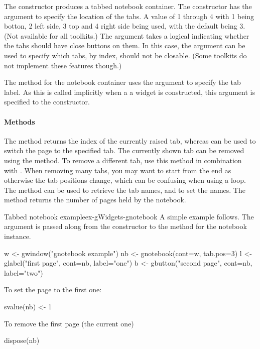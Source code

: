 The  constructor produces a tabbed notebook
container. The constructor has the argument 
to specify the location of the tabs. A value of 1 through 4 with 1
being botton, 2 left side, 3 top and 4 right side being used, with the
default being 3. (Not available for all toolkits.) The  argument takes a logical
indicating whether the tabs should have close buttons on them. In this
case, the argument  can be used to
specify which tabs, by index, should not be closable. (Some toolkits do
not implement these features though.)

The  method for the notebook container uses the 
argument to specify the tab label. As this is called implicitly when a a widget is constructed, this argument is specified to the constructor.

\paragraph{Methods}
The  method returns the index of the
currently raised tab, whereas  can be
used to switch the page to the specified tab. The currently shown tab can be
removed using the  method. To remove a
different tab, use this method in combination with
. When removing many tabs, you may want to start
from the end as otherwise the tab positions change, which can be
confusing when using a loop. The  method can
be used to retrieve the tab names, and
 to set the names. The
 method returns the number of pages held by
the notebook.


\begin{example}{Tabbed notebook example}{ex-gWidgets-gnotebook}
  A simple example follows. The  argument is passed along from the constructor
  to the  method for the notebook instance.
\begin{Schunk}
\begin{Sinput}
 w <- gwindow("gnotebook example")
 nb <- gnotebook(cont=w, tab.pos=3)
 l <- glabel("first page", cont=nb, label="one")
 b <- gbutton("second page", cont=nb, label="two")
\end{Sinput}
\end{Schunk}
To set the page to the first one:
\begin{Schunk}
\begin{Sinput}
 svalue(nb) <- 1
\end{Sinput}
\end{Schunk}
To remove the first page (the current one)
\begin{Schunk}
\begin{Sinput}
 dispose(nb)
\end{Sinput}
\end{Schunk}
\end{example}

